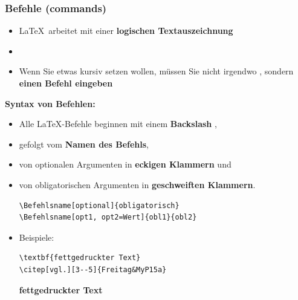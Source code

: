 \begin{frame}[fragile]
\frametitle{Befehle (commands)}


\begin{itemize}
	\item \LaTeX\ arbeitet mit einer \textbf{logischen Textauszeichnung}
	
	\item[]
	
	\item Wenn Sie etwas kursiv setzen wollen, müssen Sie nicht irgendwo , sondern \textbf{einen Befehl eingeben}
\end{itemize}

\end{frame}


\begin{frame}[fragile]

\textbf{Syntax von Befehlen:}

\pause

\begin{itemize}
	\item Alle \LaTeX -Befehle beginnen mit einem \textbf{Backslash} \gqq{\textbackslash}, 
	
	\item gefolgt vom \textbf{Namen des Befehls}, 
	
	\item von optionalen Argumenten in \textbf{eckigen Klammern} und 
	
	\item von obligatorischen Argumenten in \textbf{geschweiften Klammern}.

		
\begin{lstlisting}
\Befehlsname[optional]{obligatorisch} 
\Befehlsname[opt1, opt2=Wert]{obl1}{obl2}
\end{lstlisting}

\pause 
	
	\item Beispiele:
		
\begin{lstlisting}
\textbf{fettgedruckter Text} 
\citep[vgl.][3--5]{Freitag&MyP15a}
\end{lstlisting}

\pause 
	
	\ea \textbf{fettgedruckter Text} 
	\ex \citep[vgl.][3--5]{Freitag&MyP15a}
	\z 
\end{itemize}

\end{frame}


